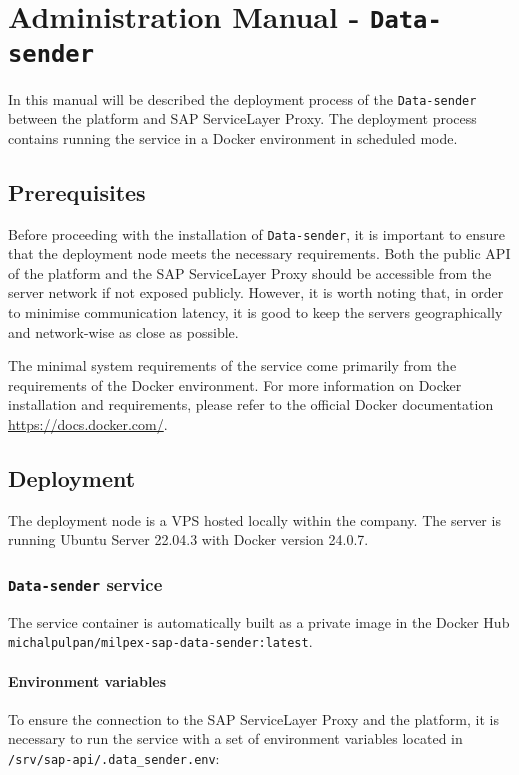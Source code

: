 \chapter{Administration Manual - \texttt{Data-sender}}
\label{attachments:admin-manual-data-sender}

In this manual will be described the deployment process of the \texttt{Data-sender} between the platform and SAP ServiceLayer Proxy.
The deployment process contains running the service in a Docker environment in scheduled mode.

\section{Prerequisites}
Before proceeding with the installation of \texttt{Data-sender}, it is important to ensure that the deployment node meets the necessary requirements.
Both the public API of the platform and the SAP ServiceLayer Proxy should be accessible from the server network if not exposed publicly.
However, it is worth noting that, in order to minimise communication latency, it is good to keep the servers geographically and network-wise as close as possible. 

The minimal system requirements of the service come primarily from the requirements of the Docker environment.
For more information on Docker installation and requirements, please refer to the official Docker documentation \url{https://docs.docker.com/}.

\section{Deployment}
\label{sec:admin-manual-sap.deployment}
The deployment node is a \ac{VPS} hosted locally within the company.
The server is running Ubuntu Server 22.04.3 with Docker version 24.0.7.

\subsection{\texttt{Data-sender} service}
The service container is automatically built as a private image in the Docker Hub \texttt{michalpulpan/milpex-sap-data-sender:latest}.

\subsubsection{Environment variables}
To ensure the connection to the SAP ServiceLayer Proxy and the platform, it is necessary to run the service with a set of environment variables located in \texttt{/srv/sap-api/.data\_sender.env}:

